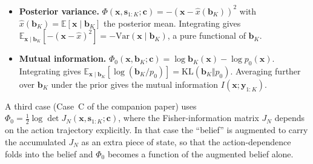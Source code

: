 \documentclass[11pt]{article}
\newcommand{\bc}{\bm{c}}
\newcommand{\bx}{\bm{x}}
\newcommand{\by}{\bm{y}}
\newcommand{\bs}{\bm{s}}
\newcommand{\bb}{\bm{b}}
\newcommand{\E}{\mathbb{E}}
\begin{document}
\begin{itemize}[nosep, leftmargin=*]
\item \textbf{Posterior variance.}  $\Phi(\bx, \bs_{1:K}; \bc) = -(\bx - \hat{x}(\bb_K))^2$ with $\hat{x}(\bb_K) = \E[\bx \mid \bb_K]$ the posterior mean.  Integrating gives $\E_{\bx \mid \bb_K}[-(\bx - \hat{x})^2] = -\mathrm{Var}(\bx \mid \bb_K)$, a pure functional of $\bb_K$.
\item \textbf{Mutual information.}  $\Phi_0(\bx, \bb_K; \bc) = \log \bb_K(\bx) - \log p_0(\bx)$.  Integrating gives $\E_{\bx \mid \bb_K}[\log(\bb_K/p_0)] = \mathrm{KL}(\bb_K \Vert p_0)$.  Averaging further over $\bb_K$ under the prior gives the mutual information $I(\bx; \by_{1:K})$.
\end{itemize}

A third case (Case~C of the companion paper) uses $\Phi_0 = \tfrac{1}{2} \log \det J_N(\bx, \bs_{1:K}; \bc)$, where the Fisher-information matrix $J_N$ depends on the action trajectory explicitly.  In that case the ``belief'' is augmented to carry the accumulated $J_N$ as an extra piece of state, so that the action-dependence folds into the belief and $\Phi_0$ becomes a function of the augmented belief alone.
\end{document}
